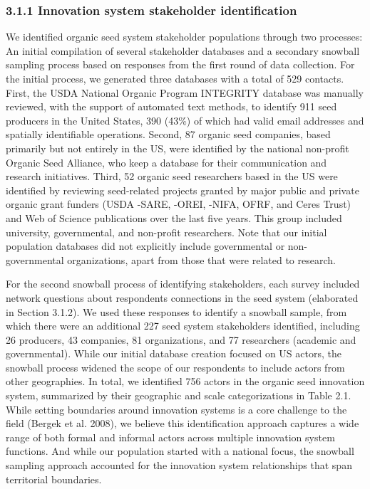 \documentclass[twoside,12pt,final]{ucthesis-CA2012}
\begin{document}
\begin{ucmainmatter}
\hypertarget{innovation-system-stakeholder-identification}{%
\subsubsection{3.1.1 Innovation system stakeholder identification}\label{innovation-system-stakeholder-identification}}

We identified organic seed system stakeholder populations through two
processes: An initial compilation of several stakeholder databases and a
secondary snowball sampling process based on responses from the first
round of data collection. For the initial process, we generated three
databases with a total of 529 contacts. First, the USDA National Organic
Program INTEGRITY database was manually reviewed, with the support of
automated text methods, to identify 911 seed producers in the United
States, 390 (43\%) of which had valid email addresses and spatially
identifiable operations. Second, 87 organic seed companies, based
primarily but not entirely in the US, were identified by the national
non-profit Organic Seed Alliance, who keep a database for their
communication and research initiatives. Third, 52 organic seed
researchers based in the US were identified by reviewing seed-related
projects granted by major public and private organic grant funders (USDA
-SARE, -OREI, -NIFA, OFRF, and Ceres Trust) and Web of Science
publications over the last five years. This group included university,
governmental, and non-profit researchers. Note that our initial
population databases did not explicitly include governmental or
non-governmental organizations, apart from those that were related to
research.

For the second snowball process of identifying stakeholders, each survey
included network questions about respondents\textquotesingle{} connections in the seed
system (elaborated in Section 3.1.2). We used these responses to
identify a snowball sample, from which there were an additional 227 seed
system stakeholders identified, including 26 producers, 43 companies, 81
organizations, and 77 researchers (academic and governmental). While our
initial database creation focused on US actors, the snowball process
widened the scope of our respondents to include actors from other
geographies. In total, we identified 756 actors in the organic seed
innovation system, summarized by their geographic and scale
categorizations in Table 2.1. While setting boundaries around innovation
systems is a core challenge to the field (Bergek et al.
2008), we believe this
identification approach captures a wide range of both formal and
informal actors across multiple innovation system functions. And while
our population started with a national focus, the snowball sampling
approach accounted for the innovation system relationships that span
territorial boundaries.


\end{ucmainmatter}
\end{document}
